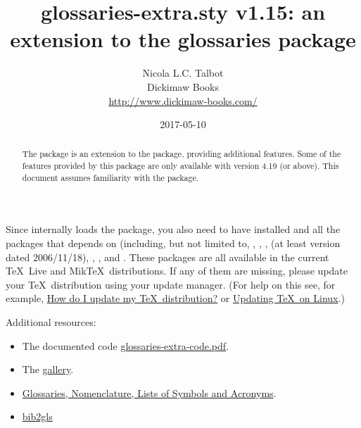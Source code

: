 \documentclass[report,inlinetitle,widecs]{nlctdoc}
\begin{document}
\DeleteShortVerb{\|}

 \title{glossaries-extra.sty v1.15:
 an extension to the glossaries package}
 \author{Nicola L.C. Talbot\\[10pt]
Dickimaw Books\\
\url{http://www.dickimaw-books.com/}}

 \date{2017-05-10}
 \maketitle

\begin{abstract}
The  package is an extension to the
 package, providing additional features.
Some of the features provided by this package are only available
with  version 4.19 (or above).
This document assumes familiarity with the  package.

\end{abstract}

\begin{important}
Since  internally loads the 
package, you also need to have  installed and
all the packages that  depends on (including, but
not limited to, , , , 
 (at least version dated 2006/11/18), ,
,  and . These
packages are all available in the current \TeX\ Live and Mik\TeX\
distributions. If any of them are missing, please update your
\TeX\ distribution using your update manager.
(For help on this see, for example,
\href{http://tex.stackexchange.com/questions/55437/how-do-i-update-my-tex-distribution}{How do I update my \TeX\ distribution?}
or
\href{http://tex.stackexchange.com/questions/14925/updating-tex-on-linux}{Updating
\TeX\ on Linux}.)
\end{important}

Additional resources:
\begin{itemize}
\item The  documented code
\href{http://mirrors.ctan.org/macros/latex/contrib/glossaries-extra/glossaries-extra-code.pdf}{glossaries-extra-code.pdf}.

\item The
\href{http://www.dickimaw-books.com/gallery/#glossaries-extra}{ gallery}.

\item
\href{http://www.latex-community.org/know-how/latex/55-latex-general/263-glossaries-nomenclature-lists-of-symbols-and-acronyms}{Glossaries,
Nomenclature, Lists of Symbols and Acronyms}.

\item \href{https://github.com/nlct/bib2gls}{bib2gls}
\end{itemize}
\end{document}
